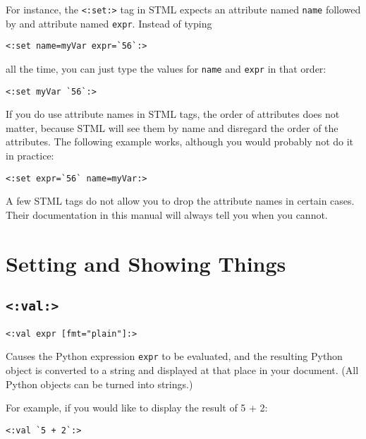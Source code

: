 \documentclass{manual}
\begin{document}
For instance, the \texttt{<:set:>} tag in STML expects
an attribute named \texttt{name} followed by and attribute named
\texttt{expr}. Instead of typing 

\begin{verbatim}
<:set name=myVar expr=`56`:>
\end{verbatim}


all the time, you can just type the values for \texttt{name}
and \texttt{expr} in that order:

\begin{verbatim}
<:set myVar `56`:>
\end{verbatim}

If you do use attribute names in STML tags, the order of attributes
does not matter, because STML will see them by name and disregard
the order of the attributes. The following example works, although
you would probably not do it in practice:

\begin{verbatim}
<:set expr=`56` name=myVar:>
\end{verbatim}

A few STML tags do not allow you to drop the attribute names
in certain cases. Their documentation in this manual will always tell
you when you cannot.




\chapter{Setting and Showing Things}
\label{stmlrefstandard}

\section{\texttt{<:val:>}}
\label{tagval}

\begin{verbatim}
<:val expr [fmt="plain"]:>
\end{verbatim}

Causes the Python expression \texttt{expr} to be evaluated, 
and the resulting Python object is converted to a string and 
displayed at that place in your document. 
(All Python objects can be turned into strings.) 

For example, if you would like to display the result of 5 + 2:

\begin{verbatim}
<:val `5 + 2`:>
\end{verbatim}
\end{document}
